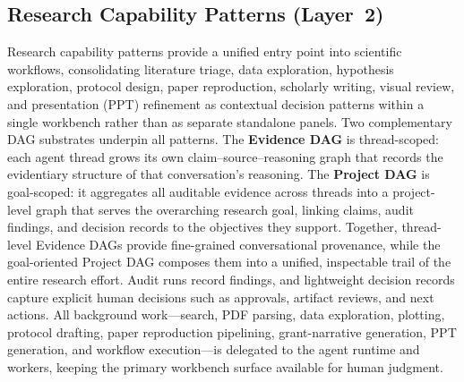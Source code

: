 \documentclass[sn-basic,Numbered,pdflatex]{sn-jnl}
\begin{document}
\subsection{Research Capability Patterns (Layer~2)}
Research capability patterns provide a unified entry point into scientific workflows, consolidating literature triage, data exploration, hypothesis exploration, protocol design, paper reproduction, scholarly writing, visual review, and presentation (PPT) refinement as contextual decision patterns within a single workbench rather than as separate standalone panels. Two complementary DAG substrates underpin all patterns. The \textbf{Evidence DAG} is thread-scoped: each agent thread grows its own claim--source--reasoning graph that records the evidentiary structure of that conversation's reasoning. The \textbf{Project DAG} is goal-scoped: it aggregates all auditable evidence across threads into a project-level graph that serves the overarching research goal, linking claims, audit findings, and decision records to the objectives they support. Together, thread-level Evidence DAGs provide fine-grained conversational provenance, while the goal-oriented Project DAG composes them into a unified, inspectable trail of the entire research effort. Audit runs record findings, and lightweight decision records capture explicit human decisions such as approvals, artifact reviews, and next actions. All background work---search, PDF parsing, data exploration, plotting, protocol drafting, paper reproduction pipelining, grant-narrative generation, PPT generation, and workflow execution---is delegated to the agent runtime and workers, keeping the primary workbench surface available for human judgment.
\end{document}
